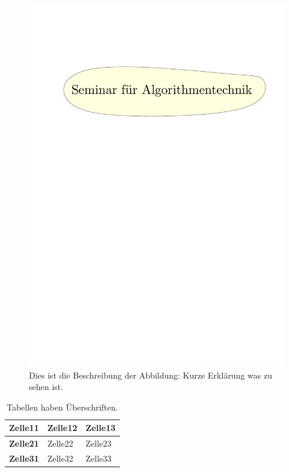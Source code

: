 \documentclass[a4paper,ngerman]{atseminar}
\begin{document}
\begin{figure}[h]
 \centering
 \includegraphics[scale = 0.7]{./picture}
 \caption{Dies ist die Beschreibung der Abbildung: Kurze Erklärung
was zu sehen ist.}
 \label{XY:fig:picture}
\end{figure}

\begin{table}[h]
\centering
\caption{Tabellen haben Überschriften.}
\begin{tabular}{l|ll}
  \textbf{Zelle11} & \textbf{Zelle12} & \textbf{Zelle13} \\
  \hline
  \textbf{Zelle21} & Zelle22 & Zelle23 \\
  \textbf{Zelle31} & Zelle32 & Zelle33 \\
  
\end{tabular}
\label{XY:tab:interessant}
\end{table}
\end{document}
